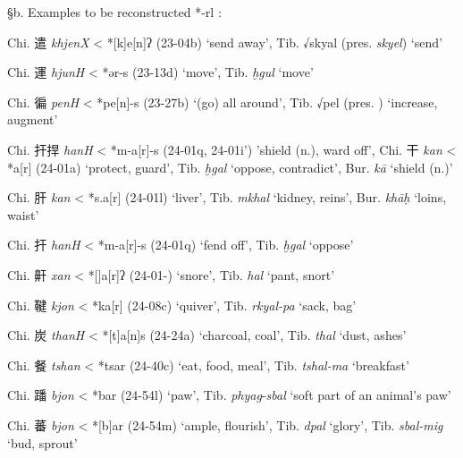 §b. Examples to be reconstructed *-rl :

\begin{description} \item
Chi. 遣 \emph{khjenX} \textless{} *[k]{}e[n]ʔ (23-04b) `send
away', Tib. √skyal (pres. {} \emph{skyel}) `send'

\item
Chi. 運 \emph{hjunH} \textless{} *{}ər-s (23-13d) `move', Tib. {} \emph{ḫgul} `move'

\item
Chi. 徧 \emph{penH} \textless{} *p{}e[n]-s (23-27b) `(go) all
around', Tib. √pel (pres. {}) `increase, augment'

\item
Chi. 扞捍 \emph{hanH} \textless{} *m-{}a{[}r]-s (24-01q, 24-01i')
'shield (n.), ward off', Chi. 干 \emph{kan} \textless{} *{}a{[}r]
(24-01a) `protect, guard', Tib. {} \emph{ḫgal} `oppose, contradict',
Bur. {} \emph{kā} `shield (n.)'

\item
Chi. 肝 \emph{kan} \textless{} *s.{}a{[}r] (24-01l) `liver', Tib. {} \emph{mkhal} `kidney, reins', Bur. {} \emph{khāḥ} `loins, waist'

Chi. 扞 \emph{hanH }\textless{} *m-{}a{[}r]-s (24-01q) `fend off',
Tib. {} \emph{ḫgal} `oppose'

\item
Chi. 鼾 \emph{xan} \textless{} *[{}]{}a{[}r]ʔ (24-01-) `snore',
Tib. {} \emph{hal} `pant, snort'

\item
Chi. 鞬 \emph{kjon} \textless{} *ka{[}r] (24-08c) `quiver', Tib. {} \emph{rkyal-pa} `sack, bag'

\item
Chi. 炭 \emph{thanH} \textless{} *[t{}]{}a[n]s (24-24a) `charcoal,
coal', Tib. {} \emph{thal} `dust, ashes'

\item
Chi. 餐 \emph{tshan} \textless{} *ts{}{}ar (24-40c) `eat, food, meal',
Tib. {} \emph{tshal-ma} `breakfast'

\item
Chi. 蹯 \emph{bjon} \textless{} *bar (24-54l) `paw', Tib. {} \emph{phyag}-\emph{sbal} `soft part of an animal's paw'

\item
Chi. 蕃 \emph{bjon} \textless{} *[b]ar (24-54m) `ample, flourish',
Tib. {} \emph{dpal} `glory', Tib. {} \emph{sbal-mig} `bud,
sprout'


\end{description}
